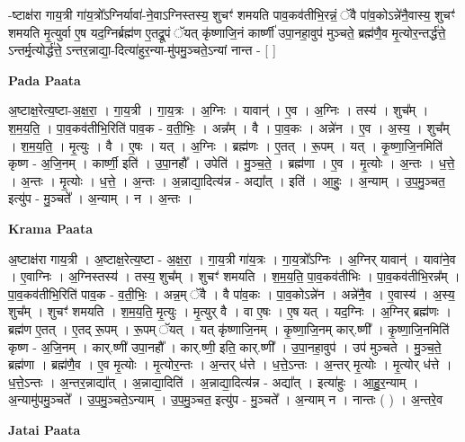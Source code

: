 \documentclass[17pt]{extarticle}
\begin{document}
-ष्टाक्ष॑रा गाय॒त्री गा॑य॒त्रो᳚ऽग्निर्यावा॑-ने॒वाऽग्निस्तस्य॒ शुचꣳ॑ शमयति पाव॒कव॑तीभि॒रन्नं॒ ॅवै पा॑व॒कोऽन्ने॑नै॒वास्य॒ शुचꣳ॑ शमयति मृ॒त्युर्वा ए॒ष यद॒ग्निर्ब्रह्म॑ण ए॒तद्रू॒पं ॅयत् कृ॑ष्णाजि॒नं कार्ष्णी॑ उपा॒नहा॒वुप॑ मुञ्चते॒ ब्रह्म॑णै॒व मृ॒त्योर॒न्तर्द्ध॑त्ते॒ ऽन्तर्मृ॒त्योर्द्ध॑त्ते॒ ऽन्तर॒न्नाद्या॒-दित्या॑हुर॒न्या-मु॑पमु॒ञ्चते॒ऽन्यां नान्त - [  ] \newline

\textbf{Pada Paata} \newline

अ॒ष्टाक्ष॒रेत्य॒ष्टा-अ॒क्ष॒रा॒ । गा॒य॒त्री । गा॒य॒त्रः । अ॒ग्निः । यावान्॑ । ए॒व । अ॒ग्निः । तस्य॑ । शुच᳚म् । श॒म॒य॒ति॒ । पा॒व॒कव॑तीभि॒रिति॑ पाव॒क - व॒ती॒भिः॒ । अन्न᳚म् । वै । पा॒व॒कः । अन्ने॑न । ए॒व । अ॒स्य॒ । शुच᳚म् । श॒म॒य॒ति॒ । मृ॒त्युः । वै ।   ए॒षः । यत् । अ॒ग्निः । ब्रह्म॑णः । ए॒तत् । रू॒पम् । यत् । कृ॒ष्णा॒जि॒नमिति॑ कृष्ण - अ॒जि॒नम् । कार्ष्णी॒ इति॑ । उ॒पा॒नहौ᳚ । उपेति॑ । मु॒ञ्च॒ते॒ । ब्रह्म॑णा । ए॒व । मृ॒त्योः । अ॒न्तः । ध॒त्ते॒ । अ॒न्तः । मृ॒त्योः । ध॒त्ते॒ । अ॒न्तः । अ॒न्नाद्या॒दित्य॑न्न - अद्या᳚त् । इति॑ । आ॒हुः॒ । अ॒न्याम् । उ॒प॒मु॒ञ्चत॒ इत्यु॑प - मु॒ञ्चते᳚ । अ॒न्याम् । न । अ॒न्तः ।  \newline


\textbf{Krama Paata} \newline

अ॒ष्टाक्ष॑रा गाय॒त्री । अ॒ष्टाक्ष॒रेत्य॒ष्टा - अ॒क्ष॒रा॒ । गा॒य॒त्री गा॑य॒त्रः । गा॒य॒त्रो᳚ऽग्निः । अ॒ग्निर् यावान्॑ । यावा॑ने॒व । ए॒वाग्निः । अ॒ग्निस्तस्य॑ । तस्य॒ शुच᳚म् । शुचꣳ॑ शमयति । श॒म॒य॒ति॒ पा॒व॒कव॑तीभिः । पा॒व॒कव॑तीभि॒रन्न᳚म् । पा॒व॒कव॑तीभि॒रिति॑ पाव॒क - व॒ती॒भिः॒ । अन्न॒म् ॅवै । वै पा॑व॒कः । पा॒व॒कोऽन्ने॑न । अन्ने॑नै॒व । ए॒वास्य॑ । अ॒स्य॒ शुच᳚म् । शुचꣳ॑ शमयति । श॒म॒य॒ति॒ मृ॒त्युः । मृ॒त्युर् वै । वा ए॒षः । ए॒ष यत् । यद॒ग्निः । अ॒ग्निर् ब्रह्म॑णः । ब्रह्म॑ण ए॒तत् । ए॒तद् रू॒पम् । रू॒पम् ॅयत् । यत् कृ॑ष्णाजि॒नम् । कृ॒ष्णा॒जि॒नम् कार्.ष्णी᳚ । कृ॒ष्णा॒जि॒नमिति॑ कृष्ण - अ॒जि॒नम् । कार्.ष्णी॑ उपा॒नहौ᳚ । कार्.ष्णी॒ इति॒ कार्.ष्णी᳚ । उ॒पा॒नहा॒वुप॑ । उप॑ मुञ्चते । मु॒ञ्च॒ते॒ ब्रह्म॑णा । ब्रह्म॑णै॒व । ए॒व मृ॒त्योः । मृ॒त्योर॒न्तः । अ॒न्तर् ध॑त्ते । ध॒त्ते॒ऽन्तः । अ॒न्तर् मृ॒त्योः । मृ॒त्योर् ध॑त्ते । ध॒त्ते॒ऽन्तः । अ॒न्तर॒न्नाद्या᳚त् । अ॒न्नाद्या॒दिति॑ । अ॒न्नाद्या॒दित्य॑न्न - अद्या᳚त् । इत्या॑हुः । आ॒हु॒र॒न्याम् । अ॒न्यामु॑पमु॒ञ्चते᳚ । उ॒प॒मु॒ञ्चते॒ऽन्याम् । उ॒प॒मु॒ञ्चत॒ इत्यु॑प - मु॒ञ्चते᳚ । अ॒न्याम् न । नान्तः ( ) । अ॒न्तरे॒व \newline

\textbf{Jatai Paata} \newline
\end{document}
